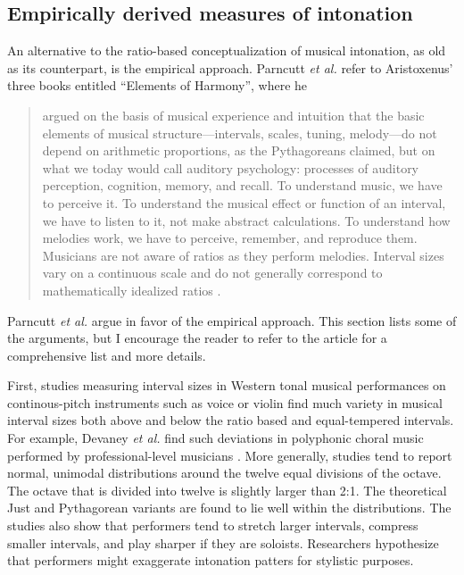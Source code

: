 \subsection{Empirically derived measures of intonation}
\label{sec:empirical}
An alternative to the ratio-based conceptualization of musical intonation, as old as its counterpart, is the empirical approach. Parncutt \textit{et al.} refer to Aristoxenus' three books entitled ``Elements of Harmony'', where he \begin{quotation}argued on the basis of musical experience and intuition that the basic elements of musical structure---intervals, scales, tuning, melody---do not depend on arithmetic proportions, as the Pythagoreans claimed, but on what we today would call auditory psychology: processes of auditory perception, cognition, memory, and recall. To understand music, we have to perceive it. To understand the musical effect or function of an interval, we have to listen to it, not make abstract calculations. To understand how melodies work, we have to perceive, remember, and reproduce them. Musicians are not aware of ratios as they perform melodies. Interval sizes vary on a continuous scale and do not generally correspond to mathematically idealized ratios \cite[][p.~475]{parncutt2018psychocultural}.\end{quotation} 

Parncutt \textit{et al.} argue in favor of the empirical approach. This section lists some of the arguments, but I encourage the reader to refer to the article for a comprehensive list and more details. 

First, studies measuring interval sizes in Western tonal musical performances on continous-pitch instruments such as voice or violin find much variety in musical interval sizes both above and below the ratio based and equal-tempered intervals. For example, Devaney \textit{et al.} find such deviations in polyphonic choral music performed by professional-level musicians \cite{devaney2011intonation}. More generally, studies tend to report normal, unimodal distributions around the twelve equal divisions of the octave. The octave that is divided into twelve is slightly larger than 2:1. The theoretical Just and Pythagorean variants are found to lie well within the distributions. The studies also show that performers tend to stretch larger intervals, compress smaller intervals, and play sharper if they are soloists. Researchers hypothesize that performers might exaggerate intonation patters for stylistic purposes. 

